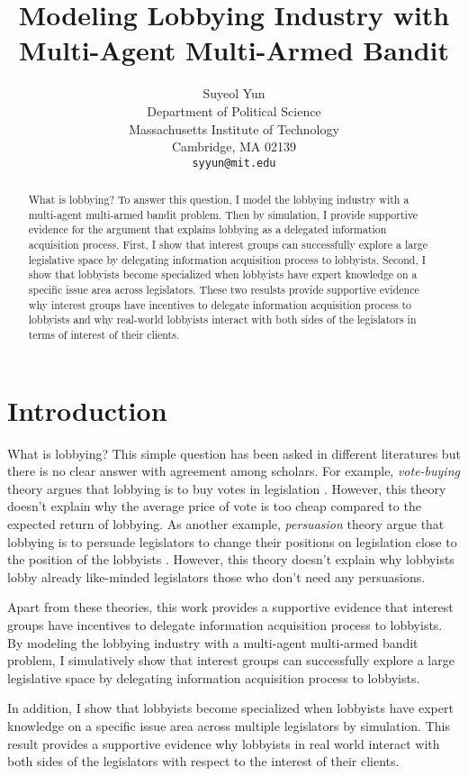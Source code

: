\documentclass{article}
\title{Modeling 
Lobbying Industry with Multi-Agent Multi-Armed Bandit}
\author{%
Suyeol Yun
\\
Department of Political Science\\
Massachusetts Institute of Technology\\
Cambridge, MA 02139 \\
\texttt{syyun@mit.edu} \\
}
\begin{document}
\maketitle
\begin{abstract}
What is lobbying?
To answer this question, 
I model the lobbying industry 
with a multi-agent multi-armed bandit problem.
Then by simulation,
I provide supportive evidence 
for the argument 
that explains lobbying 
as a delegated information acquisition process.
First, I show that 
interest groups can successfully explore 
a large legislative space
by delegating information acquisition process to lobbyists.
Second, I show that 
lobbyists become specialized
when lobbyists have 
expert knowledge on a specific issue area across 
 legislators.
These two resulsts  
provide supportive evidence
why interest groups 
have incentives to delegate information acquisition process to lobbyists
and why real-world lobbyists interact with both sides of the legislators in terms of interest of their clients.
\end{abstract}

\section{Introduction}
What is lobbying? 
This simple question has been asked in different literatures but there is no clear answer with agreement among scholars.
For example, \textit{vote-buying} theory argues 
that lobbying is to buy votes in legislation \citep{grossman}. 
However, this theory doesn't explain 
why the average price of vote is too cheap compared 
to the expected return of lobbying.
As another example, \textit{persuasion} 
theory argue that lobbying is to persuade 
legislators to change their positions on legislation close to 
the position of the lobbyists
\citep{truman, Bauer2017, milbrath1984washington}.
However, this theory doesn't 
explain why lobbyists lobby 
already like-minded legislators 
those who don't need any persuasions.

Apart from these theories,
this work 
provides a supportive evidence
that interest groups 
have incentives to delegate information acquisition process to lobbyists.
By modeling the lobbying industry 
with a multi-agent multi-armed bandit problem,
I simulatively show that
interest groups can successfully explore 
a large legislative space by delegating information acquisition process to lobbyists.

In addition, 
I show that 
lobbyists become specialized
when lobbyists have
expert knowledge on a specific issue area across
multiple legislators by simulation.
This result provides a supportive evidence
why lobbyists in real world interact 
with both sides of the legislators 
with respect to the interest of their clients.
\end{document}
